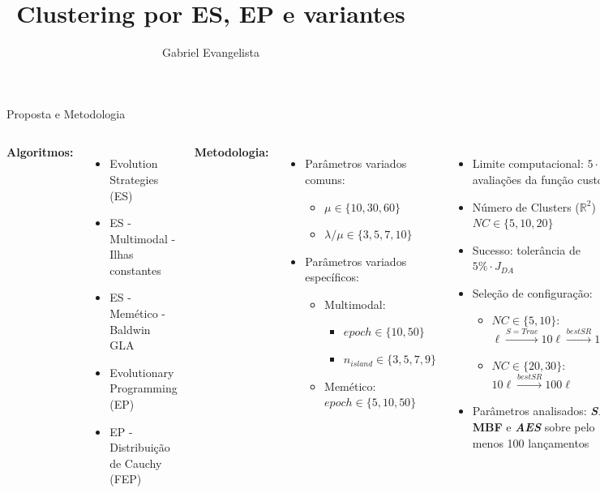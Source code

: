 \documentclass[pdf]{beamer}
\title{Clustering por ES, EP e variantes}
\author{Gabriel Evangelista}
\begin{document}
\begin{frame}{Proposta e Metodologia}
	\begin{columns}
		\textbf{Algoritmos:}
		\begin{itemize}
			\item Evolution Strategies (ES) 
			\item ES - Multimodal - Ilhas constantes
			\item ES - Memético - Baldwin GLA
			\item Evolutionary Programming (EP)
			\item EP - Distribuição de Cauchy (FEP)
		\end{itemize}
	
	
		\textbf{Metodologia:}
		\begin{itemize}
				\item Parâmetros variados comuns:
				\begin{itemize}
					\item $ \mu \in \{10, 30, 60\} $ 
					\item $ \lambda/\mu \in \{3, 5, 7, 10\} $
				\end{itemize}
				\item Parâmetros variados específicos:
				\begin{itemize}
					\item Multimodal:
					\begin{itemize}
						\item $ epoch \in \{10, 50\} $
						\item $ n_{island} \in \{3, 5, 7, 9\} $
					\end{itemize}
					\item Memético: $ epoch \in \{5, 10, 50\} $
					
				\end{itemize}				

		\end{itemize}


		\begin{itemize}
			\item Limite computacional: $ 5\cdot 10^5 $ avaliações da função custo
			\item Número de Clusters ($ \mathbb{R}^2 $) $ NC \in \{5, 10, 20\} $
			\item Sucesso: tolerância de $5\% \cdot J_{DA} $

			\item Seleção de configuração:
			\begin{itemize}
				\item $ NC \in \{5, 10\} $: $ \ell \xrightarrow{S = True} 10\ell \xrightarrow{best SR} 100 \ell$  
				\item $ NC \in \{20, 30\} $: $ 10\ell \xrightarrow{best SR} 100\ell$ 
			\end{itemize}
					\item Parâmetros analisados: \textit{\textbf{SR}}, \textbf{MBF} e \textit{\textbf{AES}} sobre pelo menos 100 lançamentos
		\end{itemize}		
	\end{columns}
\end{frame}
\end{document}
